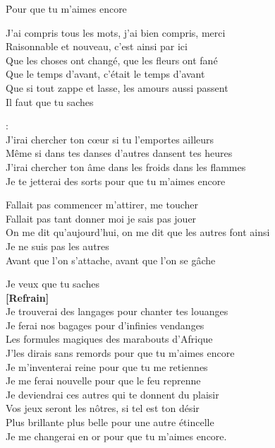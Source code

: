 \documentclass{novel}
\begin{document}
\h*{Pour que tu m’aimes encore}
\begin{multicols}{2}

J'ai compris tous les mots, j'ai bien compris, merci\\
Raisonnable et nouveau, c'est ainsi par ici\\
Que les choses ont changé, que les fleurs ont fané\\
Que le temps d'avant, c'était le temps d'avant\\
Que si tout zappe et lasse, les amours aussi passent\\

Il faut que tu saches\\

\begin{bfseries}
[Refrain]:\\
J'irai chercher ton cœur si tu l'emportes ailleurs\\
Même si dans tes danses d'autres dansent tes heures\\
J'irai chercher ton âme dans les froids dans les flammes\\
Je te jetterai des sorts pour que tu m'aimes encore\\
\end{bfseries}

Fallait pas commencer m'attirer, me toucher\\
Fallait pas tant donner moi je sais pas jouer\\
On me dit qu'aujourd'hui, on me dit que les autres font ainsi\\
Je ne suis pas les autres\\
Avant que l'on s'attache, avant que l'on se gâche\\
\columnbreak

Je veux que tu saches\\

\textbf{[Refrain]}\\

Je trouverai des langages pour chanter tes louanges\\
Je ferai nos bagages pour d'infinies vendanges\\
Les formules magiques des marabouts d'Afrique\\
J'les dirais sans remords pour que tu m'aimes encore\\

Je m'inventerai reine pour que tu me retiennes\\
Je me ferai nouvelle pour que le feu reprenne\\
Je deviendrai ces autres qui te donnent du plaisir\\
Vos jeux seront les nôtres, si tel est ton désir\\

Plus brillante plus belle pour une autre étincelle\\
Je me changerai en or pour que tu m'aimes encore.\\
\end{multicols}
\end{document}
